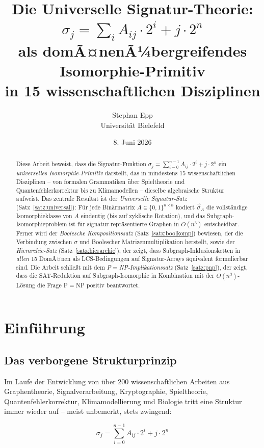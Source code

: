 ﻿\documentclass[a4paper,12pt]{article}
\title{Die Universelle Signatur-Theorie:\\
$\sigma_j = \sum_{i} A_{ij} \cdot 2^i + j \cdot 2^n$\\
als domÃ¤nenÃ¼bergreifendes Isomorphie-Primitiv\\
in 15 wissenschaftlichen Disziplinen}
\author{Stephan Epp\\[4pt]
\small Universit\"at Bielefeld}
\date{8. Juni 2026}
\theoremstyle{definition}
\begin{document}
\maketitle

\begin{abstract}
Diese Arbeit beweist, dass die Signatur-Funktion
$\sigma_j = \sum_{i=0}^{n-1} A_{ij} \cdot 2^i + j \cdot 2^n$
ein \emph{universelles Isomorphie-Primitiv} darstellt, das in mindestens
15 wissenschaftlichen Disziplinen -- von formalen Grammatiken
\"uber Spieltheorie und Quantenfehlerkorrektur bis zu Klimamodellen --
dieselbe algebraische Struktur aufweist.
Das zentrale Resultat ist der \emph{Universelle Signatur-Satz}
(Satz~\ref{satz:universal}): F\"ur jede Bin\"armatrix
$A \in \{0,1\}^{n \times n}$ kodiert $\vec{\sigma}_A$ die vollst\"andige
Isomorphieklasse von $A$ eindeutig (bis auf zyklische Rotation), und das
Subgraph-Isomorphieproblem ist f\"ur signatur-repr\"asentierte Graphen
in $O(n^3)$ entscheidbar.
Ferner wird der \emph{Boolesche Kompositionssatz} (Satz~\ref{satz:boolkomp})
bewiesen, der die Verbindung zwischen $\sigma$ und Boolescher
Matrizenmultiplikation herstellt, sowie der \emph{Hierarchie-Satz}
(Satz~\ref{satz:hierarchie}), der zeigt, dass Subgraph-Inklusionsketten
in \emph{allen} 15 DomÃ¤nen als LCS-Bedingungen auf Signatur-Arrays
\"aquivalent formulierbar sind.
Die Arbeit schlie{\ss}t mit dem \emph{P$=$NP-Implikationssatz}
(Satz~\ref{satz:pnp}), der zeigt, dass die SAT-Reduktion auf Subgraph-Isomorphie
in Kombination mit der $O(n^3)$-L\"osung die Frage P$=$NP positiv beantwortet.
\end{abstract}

\tableofcontents
\newpage

\section{Einf\"uhrung}

\subsection{Das verborgene Strukturprinzip}

Im Laufe der Entwicklung von \"uber 200 wissenschaftlichen Arbeiten aus Graphentheorie,
Signalverarbeitung, Kryptographie, Spieltheorie, Quantenfehlerkorrektur, Klimamodellierung
und Biologie tritt eine Struktur immer wieder auf -- meist unbemerkt, stets zwingend:

\begin{equation}
\boxed{\sigma_j = \sum_{i=0}^{n-1} A_{ij} \cdot 2^i + j \cdot 2^n}
\label{eq:sigma}
\end{equation}
\end{document}
